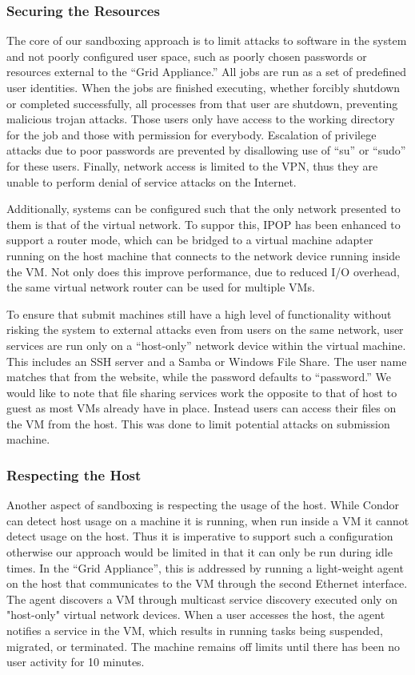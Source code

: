 \documentclass[conference]{IEEEtran}
\begin{document}
\subsubsection{Securing the Resources}

The core of our sandboxing approach is to limit attacks to software in the
system and not poorly configured user space, such as poorly chosen passwords or
resources external to the ``Grid Appliance.''  All jobs are run as a set of
predefined user identities.  When the jobs are finished executing, whether
forcibly shutdown or completed successfully, all processes from that user are
shutdown, preventing malicious trojan attacks.  Those users only have access to
the working directory for the job and those with permission for everybody.
Escalation of privilege attacks due to poor passwords are prevented by
disallowing use of ``su'' or ``sudo'' for these users.  Finally, network access
is limited to the VPN, thus they are unable to perform denial of service
attacks on the Internet.

Additionally, systems can be configured such that the only network presented to
them is that of the virtual network.  To suppor this, IPOP has been enhanced to
support a router mode, which can be bridged to a virtual machine adapter
running on the host machine that connects to the network device running inside
the VM.  Not only does this improve performance, due to reduced I/O overhead,
the same virtual network router can be used for multiple VMs.

To ensure that submit machines still have a high level of functionality without
risking the system to external attacks even from users on the same network,
user services are run only on a ``host-only'' network device within the virtual
machine.  This includes an SSH server and a Samba or Windows File Share.  The
user name matches that from the website, while the password defaults to
``password.''  We would like to note that file sharing services work the
opposite to that of host to guest as most VMs already have in place.  Instead
users can access their files on the VM from the host.  This was done to limit
potential attacks on submission machine.

\subsubsection{Respecting the Host}

Another aspect of sandboxing is respecting the usage of the host.  While Condor
can detect host usage on a machine it is running, when run inside a VM it
cannot detect usage on the host.  Thus it is imperative to support such a
configuration otherwise our approach would be limited in that it can only be
run during idle times.  In the ``Grid Appliance'', this is addressed by running
a light-weight agent on the host that communicates to the VM through the second
Ethernet interface.  The agent discovers a VM through multicast service
discovery executed only on "host-only" virtual network devices.  When a user
accesses the host, the agent notifies a service in the VM, which results in
running tasks being suspended, migrated, or terminated.  The machine remains
off limits until there has been no user activity for 10 minutes.
\end{document}
